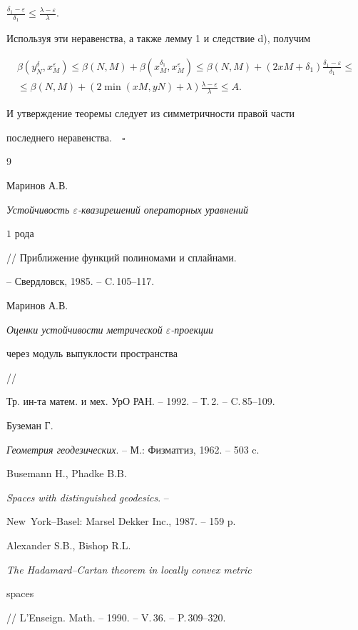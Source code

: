$\frac{\delta_{1} - \varepsilon }{\delta_{1}} \leq


\frac{\lambda - \varepsilon }{\lambda }$.


Используя эти неравенства, а также лемму 1 и следствие d), получим


\begin{multline*}


\beta (y_{N}^{\delta },x_{M}^{\varepsilon }) \leq


\beta (N,M) + \beta (x_{M}^{\delta_{1}},x_{M}^{\varepsilon }) \leq 


\beta (N,M) + (2xM + \delta_{1})\frac{\delta_{1} - \varepsilon }


{\delta_{1}} \leq \\ \le \beta (N,M) + 


(2\min (xM,yN) + \lambda) \frac{\lambda - \varepsilon }{\lambda } \leq A.


\end{multline*}


И утверждение теоремы следует из симметричности правой части 


последнего неравенства$.\quad\square$





\begin{thebibliography}{9}





 Маринов А.В.


{\em Устойчивость $\varepsilon$-квазирешений операторных уравнений


$1$ рода} // Приближение функций полиномами и сплайнами. 


-- Свердловск, 1985. -- C.\,105--117.


 Маринов А.В.


{\em Оценки устойчивости метрической $\varepsilon$-проекции 


через модуль выпуклости пространства} //


Тр. ин-та матем. и мех. УрО РАН. -- 1992. -- Т.\,2. -- C.\,85--109.


 Буземан Г.


{\em Геометрия геодезических}. -- М.: Физматгиз, 1962. -- 503 c.


 Busemann H., Phadke B.B. 


{\em Spaces with distinguished geodesics}. --


New~York--Basel: Marsel Dekker Inc., 1987. -- 159 p.


 Alexander S.B., Bishop R.L. 


{\em The Hadamard--Cartan theorem in locally convex metric 


spaces} // L'Enseign. Math. -- 1990. -- V.\,36. -- P.\,309--320.





\end{thebibliography}





